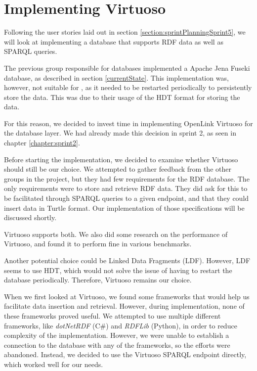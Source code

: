 \section{Implementing Virtuoso}\label{sec:implementing_virtuoso}
Following the user stories laid out in section \ref{section:sprintPlanningSprint5}, we will look at implementing a database that supports RDF data as well as SPARQL queries.

The previous group responsible for \knox{} databases implemented a Apache Jena Fuseki database, as described in section \ref{currentState}.
This implementation was, however, not suitable for \knox{}, as it needed to be restarted periodically to persistently store the data. This was due to their usage of the HDT format for storing the data\cite{knox2020}.

For this reason, we decided to invest time in implementing OpenLink Virtuoso\cite{OpenLinkSoftwareVirtuoso} for the \knox{} database layer. We had already made this decision in sprint 2, as seen in chapter \ref{chapter:sprint2}.

Before starting the implementation, we decided to examine whether Virtuoso should still be our choice.
We attempted to gather feedback from the other groups in the \knox{} project, but they had few requirements for the RDF database. The only requirements were to store and retrieve RDF data.
They did ask for this to be facilitated through SPARQL queries to a given endpoint, and that they could insert data in Turtle format. Our implementation of those specifications will be discussed shortly.

Virtuoso supports both. We also did some research on the performance of Virtuoso, and found it to perform fine in various benchmarks\cite{addleseeComparingLinkedData2019}\cite{jovanovikBenchmarkingVirtuosoMighty2018}.

Another potential choice could be Linked Data Fragments (LDF). However, LDF seems to use HDT\cite{HostServerTriple}, which would not solve the issue of having to restart the database periodically. Therefore, Virtuoso remains our choice.

When we first looked at Virtuoso, we found some frameworks that would help us facilitate data insertion and retrieval.  However, during implementation, none of these frameworks proved useful. We attempted to use multiple different frameworks, like \textit{dotNetRDF} (C\#) and \textit{RDFLib} (Python), in order to reduce complexity of the implementation. However, we were unable to establish a connection to the database with any of the frameworks, so the efforts were abandoned. Instead, we decided to use the Virtuoso SPARQL endpoint directly, which worked well for our needs.

